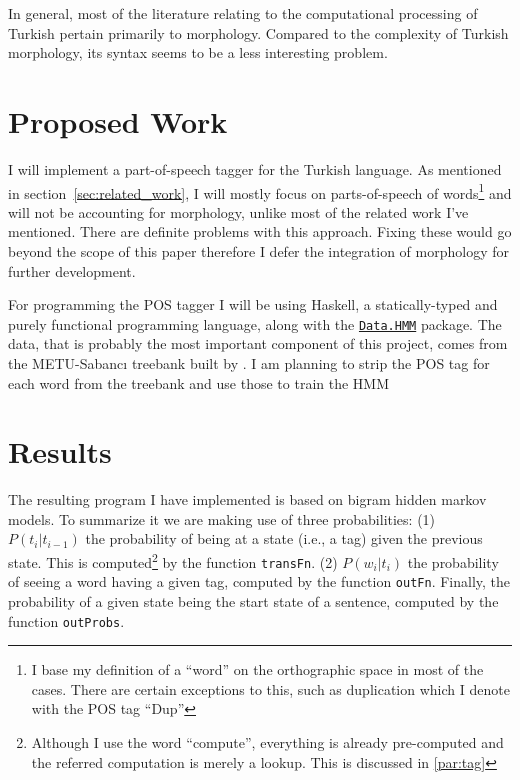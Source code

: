\documentclass{article}
\newcommand{\hmmURL}{https://hackage.haskell.org/package/hmm-0.2.1.1/docs/Data-HMM.html}
\begin{document}
In general, most of the literature relating to the computational processing of
Turkish pertain primarily to morphology. Compared to the complexity of Turkish
morphology, its syntax seems to be a less interesting problem.

\section{Proposed Work}

I will implement a part-of-speech tagger for the Turkish language. As mentioned
in section~\ref{sec:related_work}, I will mostly focus on parts-of-speech of
words\footnote{I base my definition of a ``word'' on the orthographic space in
  most of the cases. There are certain exceptions to this, such as duplication
  which I denote with the POS tag ``Dup''} and will not be accounting for
morphology, unlike most of the related work I've mentioned. There are definite
problems with this approach. Fixing these would go beyond the scope of this
paper therefore I defer the integration of morphology for further development.

For programming the POS tagger I will be using Haskell, a statically-typed and
purely functional programming language, along with the
\href{\hmmURL}{\texttt{Data.HMM}} package. The data, that is probably the most
important component of this project, comes from the METU-Sabanc{\i} treebank
built by \citet{oflazer2003building}. I am planning to strip the POS tag for
each word from the treebank and use those to train the HMM

\section{Results}
The resulting program I have implemented is based on bigram hidden markov
models. To summarize it we are making use of three probabilities: (1) $P(t_i |
t_{i-1})$ the probability of being at a state (i.e., a tag) given the previous
state. This is computed\footnote{Although I use the word ``compute'', everything
  is already pre-computed and the referred computation is merely a lookup. This
  is discussed in \ref{par:tag}} by the function \texttt{transFn}. (2) $P(w_i | t_i)$ the
probability of seeing a word having a given tag, computed by the function
\texttt{outFn}. Finally, the probability of a given state being the start state
of a sentence, computed by the function \texttt{outProbs}.
\end{document}
